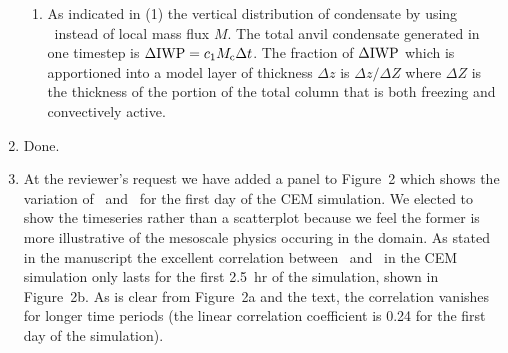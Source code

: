 \documentclass[12pt,twoside]{article}
\begin{document}
\begin{enumerate}
\begin{enumerate}
\item As indicated in (1) the vertical distribution of condensate by
using \Mc\ instead of local mass flux $M$.
The total anvil condensate generated in one timestep is $\Delta \mbox{\textrm{IWP}} =
c_1 \mbox{$M_\mathrm{c}$} \Delta t$.
The fraction of $\Delta \mbox{\textrm{IWP}}$ which is apportioned into a model layer
of thickness $\Delta z$ is $\Delta z/\Delta Z$ where $\Delta Z$ is the
thickness of the portion of the total column that is both freezing and
convectively active.

\end{enumerate}

\item Done.

\item At the reviewer's request we have added a panel to Figure~2
which shows the variation of \Mc\ and \IWPdot\ for the first day of
the CEM simulation.
We elected to show the timeseries rather than a scatterplot because
we feel the former is more illustrative of the mesoscale physics
occuring in the domain.
As stated in the manuscript the excellent correlation between
\Mc\ and \IWPdot\ in the CEM simulation only lasts for the first
2.5~hr of the simulation, shown in Figure~2b.
As is clear from Figure~2a and the text, the correlation vanishes for
longer time periods (the linear correlation coefficient is 0.24 for
the first day of the simulation). 



\end{enumerate}
\end{document}
